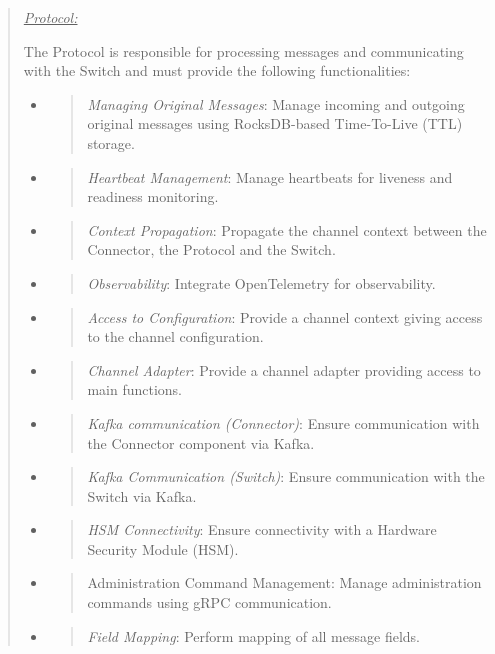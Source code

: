 \documentclass[12pt,a4paper]{report}
\begin{document}
\begin{quote}
\emph{\uline{Protocol:}}

The Protocol is responsible for processing messages and communicating
with the Switch and must provide the following functionalities:
\begin{itemize}
\item
  \begin{quote}
  \emph{Managing Original Messages}: Manage incoming and outgoing
  original messages using RocksDB-based Time-To-Live (TTL) storage.
  \end{quote}
\item
  \begin{quote}
  \emph{Heartbeat Management}: Manage heartbeats for liveness and
  readiness monitoring.
  \end{quote}
\item
  \begin{quote}
  \emph{Context Propagation}: Propagate the channel context between the
  Connector, the Protocol and the Switch.
  \end{quote}
\item
  \begin{quote}
  \emph{Observability}: Integrate OpenTelemetry for observability.
  \end{quote}
\item
  \begin{quote}
  \emph{Access to Configuration}: Provide a channel context giving
  access to the channel configuration.
  \end{quote}
\item
  \begin{quote}
  \emph{Channel Adapter}: Provide a channel adapter providing access to
  main functions.
  \end{quote}
\item
  \begin{quote}
  \emph{Kafka communication (Connector)}: Ensure communication with the
  Connector component via Kafka.
  \end{quote}
\item
  \begin{quote}
  \emph{Kafka Communication (Switch)}: Ensure communication with the
  Switch via Kafka.
  \end{quote}
\item
  \begin{quote}
  \emph{HSM Connectivity}: Ensure connectivity with a Hardware Security
  Module (HSM).
  \end{quote}
\item
  \begin{quote}
  Administration Command Management: Manage administration commands
  using gRPC communication.
  \end{quote}
\item
  \begin{quote}
  \emph{Field Mapping}: Perform mapping of all message fields.
  \end{quote}
\end{itemize}
\end{quote}
\end{document}
